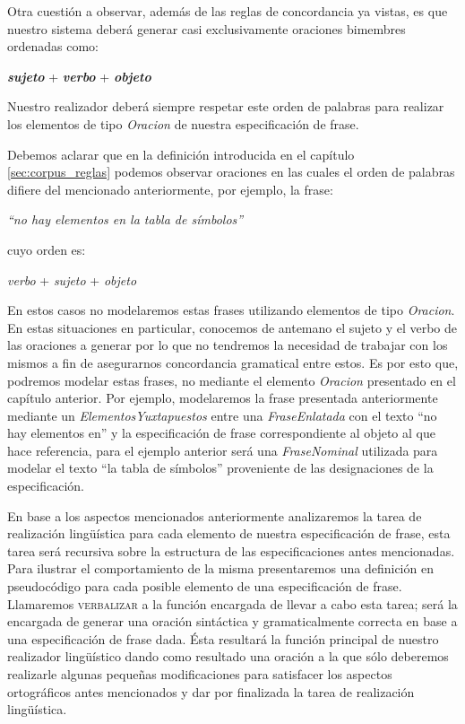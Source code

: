 \bigskip
Otra cuestión a observar, además de las reglas de concordancia ya vistas, es que nuestro sistema deberá generar casi exclusivamente oraciones bimembres ordenadas como:

\begin{center}
\emph{\textbf{sujeto}} + \emph{\textbf{verbo}} + \emph{\textbf{objeto}}
\end{center}

Nuestro realizador deberá siempre respetar este orden de palabras para realizar los elementos de tipo \emph{Oracion} de nuestra especificación de frase. 

Debemos aclarar que en la definición introducida en el capítulo \ref{sec:corpus_reglas} podemos observar oraciones en las cuales el orden de palabras difiere del mencionado anteriormente, por ejemplo, la frase:

\begin{center}
\emph{``no hay elementos en la tabla de símbolos''}
\end{center}

\noindent
cuyo orden es: 

\begin{center}
\emph{verbo} + \emph{sujeto} + \emph{objeto}
\end{center}

En estos casos no modelaremos estas frases utilizando elementos de tipo \emph{Oracion}. En estas situaciones en particular, conocemos de antemano el sujeto y el verbo de las oraciones a generar por lo que no tendremos la necesidad de trabajar con los mismos a fin de asegurarnos concordancia gramatical entre estos. Es por esto que, podremos modelar estas frases, no mediante el elemento \emph{Oracion} presentado en el capítulo anterior. Por ejemplo, modelaremos la frase presentada anteriormente mediante un \emph{ElementosYuxtapuestos} entre una \emph{FraseEnlatada} con el texto ``no hay elementos en'' y la especificación de frase correspondiente al objeto al que hace referencia, para el ejemplo anterior será una \emph{FraseNominal} utilizada para modelar el texto ``la tabla de símbolos'' proveniente de las designaciones de la especificación.


\bigskip
En base a los aspectos mencionados anteriormente analizaremos la tarea de realización lingüística para cada elemento de nuestra especificación de frase, esta tarea será recursiva sobre la estructura de las especificaciones antes mencionadas. Para ilustrar el comportamiento de la misma presentaremos una definición en pseudocódigo para cada posible elemento de una especificación de frase. Llamaremos \textsc{verbalizar} a la función encargada de llevar a cabo esta tarea; será la encargada de generar una oración sintáctica y gramaticalmente correcta  en base a una especificación de frase dada. Ésta resultará la función principal de nuestro realizador lingüístico dando como resultado una oración a la que sólo deberemos realizarle algunas pequeñas modificaciones para satisfacer los aspectos ortográficos antes mencionados y dar por finalizada la tarea de realización lingüística.

